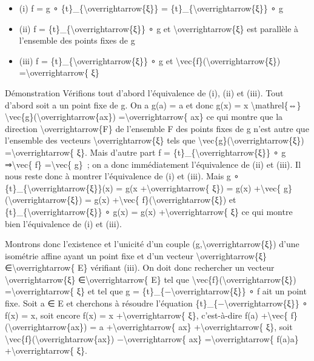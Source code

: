 \documentclass[]{article}
\begin{document}
\begin{itemize}
\itemsep1pt\parskip0pt
\item
  (i) f = g ∘ \{t\}\_\{\textbackslash{}overrightarrow\{ξ\}\} =
  \{t\}\_\{\textbackslash{}overrightarrow\{ξ\}\} ∘ g
\item
  (ii) f = \{t\}\_\{\textbackslash{}overrightarrow\{ξ\}\} ∘ g et
  \textbackslash{}overrightarrow\{ξ\} est parallèle à l'ensemble des
  points fixes de g
\item
  (iii) f = \{t\}\_\{\textbackslash{}overrightarrow\{ξ\}\} ∘ g et
  \textbackslash{}vec\{f\}(\textbackslash{}overrightarrow\{ξ\})
  =\textbackslash{}overrightarrow\{ ξ\}
\end{itemize}

Démonstration Vérifions tout d'abord l'équivalence de (i), (ii) et
(iii). Tout d'abord soit a un point fixe de g. On a g(a) = a et donc
g(x) = x \textbackslash{}mathrel\{⇔\}
\textbackslash{}vec\{g\}(\textbackslash{}overrightarrow\{ax\})
=\textbackslash{}overrightarrow\{ ax\} ce qui montre que la direction
\textbackslash{}overrightarrow\{F\} de l'ensemble F des points fixes de
g n'est autre que l'ensemble des vecteurs
\textbackslash{}overrightarrow\{ξ\} tels que
\textbackslash{}vec\{g\}(\textbackslash{}overrightarrow\{ξ\})
=\textbackslash{}overrightarrow\{ ξ\}. Mais d'autre part f =
\{t\}\_\{\textbackslash{}overrightarrow\{ξ\}\} ∘ g
⇒\textbackslash{}vec\{ f\} =\textbackslash{}vec\{ g\}~; on a donc
immédiatement l'équivalence de (ii) et (iii). Il nous reste donc à
montrer l'équivalence de (i) et (iii). Mais g ∘
\{t\}\_\{\textbackslash{}overrightarrow\{ξ\}\}(x) = g(x
+\textbackslash{}overrightarrow\{ ξ\}) = g(x) +\textbackslash{}vec\{
g\}(\textbackslash{}overrightarrow\{ξ\}) = g(x) +\textbackslash{}vec\{
f\}(\textbackslash{}overrightarrow\{ξ\}) et
\{t\}\_\{\textbackslash{}overrightarrow\{ξ\}\} ∘ g(x) = g(x)
+\textbackslash{}overrightarrow\{ ξ\} ce qui montre bien l'équivalence
de (i) et (iii).

Montrons donc l'existence et l'unicité d'un couple
(g,\textbackslash{}overrightarrow\{ξ\}) d'une isométrie affine ayant un
point fixe et d'un vecteur \textbackslash{}overrightarrow\{ξ\}
∈\textbackslash{}overrightarrow\{ E\} vérifiant (iii). On doit donc
rechercher un vecteur \textbackslash{}overrightarrow\{ξ\}
∈\textbackslash{}overrightarrow\{ E\} tel que
\textbackslash{}vec\{f\}(\textbackslash{}overrightarrow\{ξ\})
=\textbackslash{}overrightarrow\{ ξ\} et tel que g =
\{t\}\_\{−\textbackslash{}overrightarrow\{ξ\}\} ∘ f ait un point fixe.
Soit a ∈ E et cherchons à résoudre l'équation
\{t\}\_\{−\textbackslash{}overrightarrow\{ξ\}\} ∘ f(x) = x, soit encore
f(x) = x +\textbackslash{}overrightarrow\{ ξ\}, c'est-à-dire f(a)
+\textbackslash{}vec\{ f\}(\textbackslash{}overrightarrow\{ax\}) = a
+\textbackslash{}overrightarrow\{ ax\} +\textbackslash{}overrightarrow\{
ξ\}, soit \textbackslash{}vec\{f\}(\textbackslash{}overrightarrow\{ax\})
−\textbackslash{}overrightarrow\{ ax\} =\textbackslash{}overrightarrow\{
f(a)a\} +\textbackslash{}overrightarrow\{ ξ\}.
\end{document}
